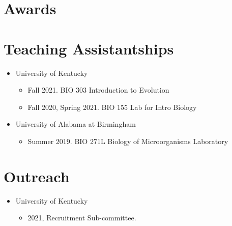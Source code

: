 \documentclass[11pt]{article}
\begin{document}
    \section*{Awards}


    \section*{Teaching Assistantships}
        \begin{itemize}[leftmargin=.25in]
            \item University of Kentucky
                \begin{itemize}
                \item Fall 2021. BIO 303 Introduction to Evolution
                \item Fall 2020, Spring 2021. BIO 155 Lab for Intro Biology
                \end{itemize}
            \item University of Alabama at Birmingham
                \begin{itemize}
                \item Summer 2019. BIO 271L Biology of Microorganisms Laboratory
                \end{itemize}
        \end{itemize}


    \section*{Outreach}
        \begin{itemize}[leftmargin=.25in]
            \item University of Kentucky
                \begin{itemize}
                    \item 2021, Recruitment Sub-committee. 
                \end{itemize}
        
        \end{itemize} 
\end{document}
